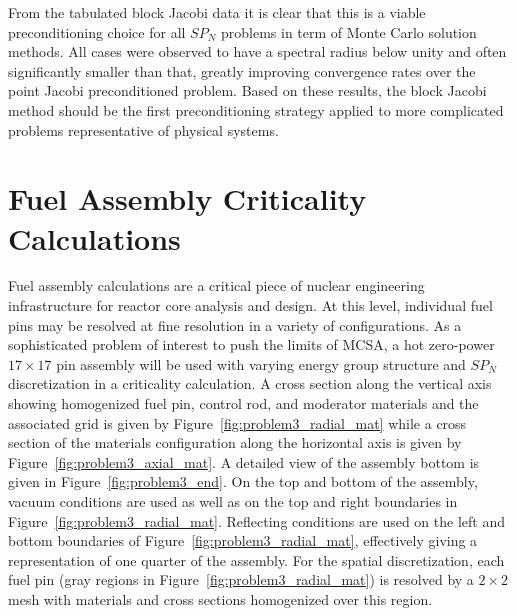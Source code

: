 From the tabulated block Jacobi data it is clear that this is a viable
preconditioning choice for all $SP_N$ problems in term of Monte Carlo
solution methods. All cases were observed to have a spectral radius
below unity and often significantly smaller than that, greatly
improving convergence rates over the point Jacobi preconditioned
problem. Based on these results, the block Jacobi method should be the
first preconditioning strategy applied to more complicated problems
representative of physical systems.

\section{Fuel Assembly Criticality Calculations}
\label{sec:fuel_assembly_calcs}
Fuel assembly calculations are a critical piece of nuclear engineering
infrastructure for reactor core analysis and design. At this level,
individual fuel pins may be resolved at fine resolution in a variety
of configurations. As a sophisticated problem of interest to push the
limits of MCSA, a hot zero-power $17 \times 17$ pin assembly will be
used with varying energy group structure and $SP_N$ discretization in
a criticality calculation. A cross section along the vertical axis
showing homogenized fuel pin, control rod, and moderator materials and
the associated grid is given by Figure~\ref{fig:problem3_radial_mat}
while a cross section of the materials configuration along the
horizontal axis is given by Figure~\ref{fig:problem3_axial_mat}. A
detailed view of the assembly bottom is given in
Figure~\ref{fig:problem3_end}. On the top and bottom of the assembly,
vacuum conditions are used as well as on the top and right boundaries
in Figure~\ref{fig:problem3_radial_mat}. Reflecting conditions are
used on the left and bottom boundaries of
Figure~\ref{fig:problem3_radial_mat}, effectively giving a
representation of one quarter of the assembly. For the spatial
discretization, each fuel pin (gray regions in
Figure~\ref{fig:problem3_radial_mat}) is resolved by a $2 \times 2$
mesh with materials and cross sections homogenized over this region.

